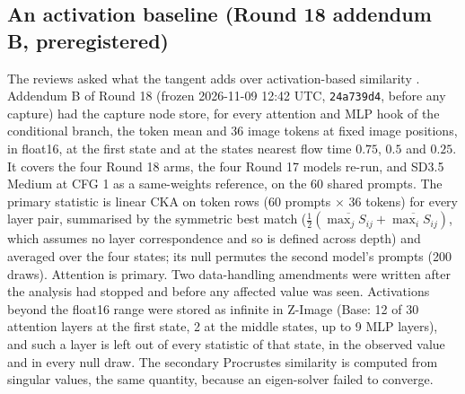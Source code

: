 \documentclass[11pt]{article}
\begin{document}
\subsection{An activation baseline (Round 18 addendum B, preregistered)}\label{sec:cka}
The reviews asked what the tangent adds over activation-based similarity \citep{kornblith2019similarity,raghu2017svcca}. Addendum B of Round 18 (frozen 2026-11-09 12:42 UTC, \texttt{24a739d4}, before any capture) had the capture node store, for every attention and MLP hook of the conditional branch, the token mean and 36 image tokens at fixed image positions, in float16, at the first state and at the states nearest flow time $0.75$, $0.5$ and $0.25$. It covers the four Round 18 arms, the four Round 17 models re-run, and SD3.5 Medium at CFG 1 as a same-weights reference, on the 60 shared prompts. The primary statistic is linear CKA on token rows (60 prompts $\times$ 36 tokens) for every layer pair, summarised by the symmetric best match ($\tfrac12(\overline{\max_j S_{ij}}+\overline{\max_i S_{ij}})$, which assumes no layer correspondence and so is defined across depth) and averaged over the four states; its null permutes the second model's prompts (200 draws). Attention is primary. Two data-handling amendments were written after the analysis had stopped and before any affected value was seen. Activations beyond the float16 range were stored as infinite in Z-Image (Base: 12 of 30 attention layers at the first state, 2 at the middle states, up to 9 MLP layers), and such a layer is left out of every statistic of that state, in the observed value and in every null draw. The secondary Procrustes similarity is computed from singular values, the same quantity, because an eigen-solver failed to converge.
\end{document}
